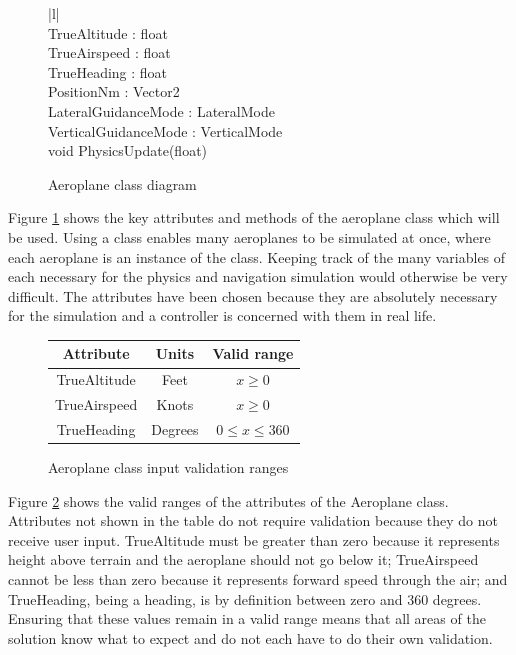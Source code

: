 \documentclass{article}
\begin{document}
\begin{figure}[H]
\centering
\begin{tabular}{ |l| } 
\hline
{} \\
\hline
TrueAltitude : float \\
TrueAirspeed : float \\
TrueHeading : float \\
PositionNm : Vector2 \\
LateralGuidanceMode : LateralMode \\
VerticalGuidanceMode : VerticalMode \\
\hline
void PhysicsUpdate(float) \\
\hline
\end{tabular}
\caption{\label{fig:aeroplaneclass}Aeroplane class diagram}
\end{figure}

Figure \ref{fig:aeroplaneclass} shows the key attributes and methods of the aeroplane class which will be used.
Using a class enables many aeroplanes to be simulated at once, where each aeroplane is an instance of the class.
Keeping track of the many variables of each necessary for the physics and navigation simulation would otherwise be very difficult.
The attributes have been chosen because they are absolutely necessary for the simulation and a controller is concerned with them in real life.

\begin{figure}[H]
\centering
\begin{tabular}{ |c|c|c| }
\hline
Attribute & Units & Valid range \\
\hline
TrueAltitude & Feet & $x \geq 0$ \\
\hline
TrueAirspeed & Knots & $x \geq 0$ \\
\hline
TrueHeading & Degrees & $0 \leq x \leq 360$ \\
\hline
\end{tabular}
\caption{\label{fig:aeroplaneclassinputs}Aeroplane class input validation ranges}
\end{figure}

Figure \ref{fig:aeroplaneclassinputs} shows the valid ranges of the attributes of the Aeroplane class.
Attributes not shown in the table do not require validation because they do not receive user input.
TrueAltitude must be greater than zero because it represents height above terrain and the aeroplane should not go below it; TrueAirspeed cannot be less than zero because it represents forward speed through the air; and TrueHeading, being a heading, is by definition between zero and 360 degrees.
Ensuring that these values remain in a valid range means that all areas of the solution know what to expect and do not each have to do their own validation.
\end{document}
